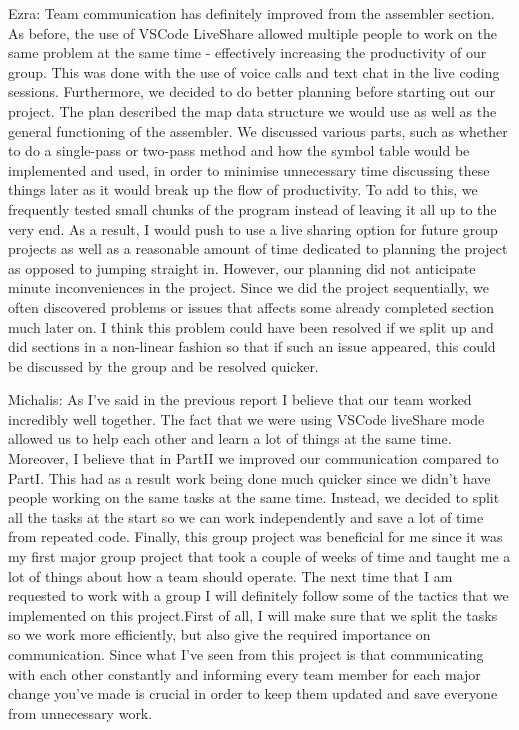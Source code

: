 \documentclass[a4paper]{article}
\begin{document}
Ezra: Team communication has definitely improved from the assembler section. As before, the use of VSCode LiveShare allowed multiple
people to work on the same problem at the same time - effectively increasing the productivity of our group. This was done with the use
of voice calls and text chat in the live coding sessions. Furthermore, we decided to do better planning before starting out our project. 
The plan described the map data structure we would use as well as the general functioning of the assembler. We discussed various parts, such
as whether to do a single-pass or two-pass method and how the symbol table would be implemented and used, in order to minimise unnecessary time
discussing these things later as it would break up the flow of productivity. To add to this, we frequently tested small chunks of the program
instead of leaving it all up to the very end. As a result, I would push to use a live sharing option for future
group projects as well as a reasonable amount of time dedicated to planning the project as opposed to jumping straight in. However, our planning
did not anticipate minute inconveniences in the project. Since we did the project sequentially, we often discovered problems or issues that affects
some already completed section much later on. I think this problem could have been resolved if we split up and did sections in a non-linear fashion
so that if such an issue appeared, this could be discussed by the group and be resolved quicker.

Michalis: As I've said in the previous report I believe that our team worked incredibly well together. The fact that 
we were using VSCode liveShare mode allowed us to help each other and learn a lot of things at the same time. 
Moreover, I believe that in PartII we improved our communication compared to PartI. This had as a result work being
done much quicker since we didn't have people working on the same tasks at the same time. Instead, 
we decided to split all the tasks at the start so we can work independently and save a lot of time from repeated code.
Finally, this group project was beneficial for me since it was my first major group project that took a couple of weeks of time 
and taught me a lot of things about how a team should operate. The next time that I am requested to work with a group I will 
definitely follow some of the tactics that we implemented on this project.First of all, I will make sure that we split the tasks 
so we work more efficiently, but also give the required importance on communication. Since what I've seen from this project is that 
communicating with each other constantly and informing every team member for each major change you've made is crucial in order to keep
them updated and save everyone from unnecessary work.
\end{document}
